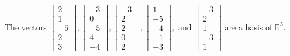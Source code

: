 \begin{exercise}
\begin{exerciseStatement}
  \end{exerciseStatement}
  \begin{exerciseAnswer}
   The vectors \(\left[\begin{array}{r}
2 \\
1 \\
-5 \\
2 \\
3
\end{array}\right] , \left[\begin{array}{r}
-3 \\
0 \\
-5 \\
4 \\
-4
\end{array}\right] , \left[\begin{array}{r}
-3 \\
2 \\
2 \\
0 \\
2
\end{array}\right] , \left[\begin{array}{r}
1 \\
-5 \\
-4 \\
-1 \\
-3
\end{array}\right] , \text{ and } \left[\begin{array}{r}
-3 \\
2 \\
1 \\
-3 \\
1
\end{array}\right]\) 
  	 are  a basis of \(\mathbb{R}^5\).
  


  \end{exerciseAnswer}
\end{exercise}
